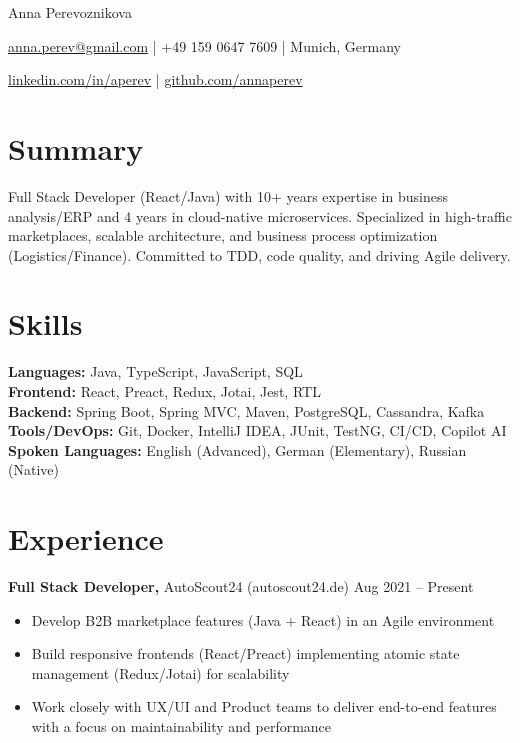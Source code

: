 \documentclass[11pt]{article}
\begin{document}
\centerline{\Huge Anna Perevoznikova}

\vspace{5pt}

\centerline{\href{mailto:anna.perev@gmail.com}{anna.perev@gmail.com} | +49 159 0647 7609 | Munich, Germany}
\centerline{\href{https://www.linkedin.com/in/aperev}{linkedin.com/in/aperev} | \href{https://github.com/annaperev}{github.com/annaperev}}

\vspace{-10pt}

\section*{Summary}
Full Stack Developer (React/Java) with 10+ years expertise in business analysis/ERP and 4 years in cloud-native microservices. Specialized in high-traffic marketplaces, scalable architecture, and business process optimization (Logistics/Finance). Committed to TDD, code quality, and driving Agile delivery.

\section*{Skills}
\textbf{Languages:} Java, TypeScript, JavaScript, SQL \\
\textbf{Frontend:} React, Preact, Redux, Jotai, Jest, RTL \\
\textbf{Backend:} Spring Boot, Spring MVC, Maven, PostgreSQL, Cassandra, Kafka \\
\textbf{Tools/DevOps:} Git, Docker, IntelliJ IDEA, JUnit, TestNG, CI/CD, Copilot AI \\
\textbf{Spoken Languages:} English (Advanced), German (Elementary), Russian (Native)

\vspace{-6.5pt}

\section*{Experience}
\textbf{Full Stack Developer,} AutoScout24 (autoscout24.de) \hfill Aug 2021 -- Present \\
\vspace{-9pt}
\begin{itemize}
  \item Develop B2B marketplace features (Java + React) in an Agile environment
  \item Build responsive frontends (React/Preact) implementing atomic state management (Redux/Jotai) for scalability
  \item Work closely with UX/UI and Product teams to deliver end-to-end features with a focus on maintainability and performance
\end{itemize}
\end{document}
